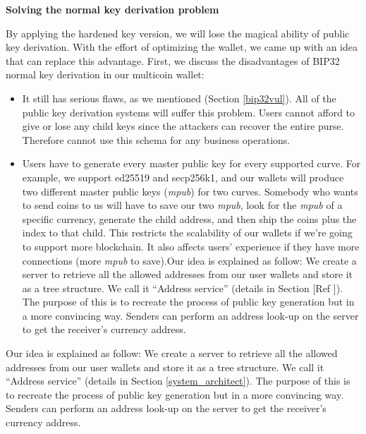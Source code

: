 \begin{adjustwidth}{1cm}{}

    \bigskip
    {\textbf{Solving the normal key derivation problem}}

    By applying the hardened key version, we will lose the magical ability of public key derivation. With the effort of optimizing the wallet, we came up with an idea that can replace this advantage. First, we discuss the disadvantages of BIP32 normal key derivation in our multicoin wallet:

    \begin{itemize}
        \item It still has serious flaws, as we mentioned (Section \ref{bip32vul}). All of the public key derivation systems will suffer this problem. Users cannot afford to give or lose any child keys since the attackers can recover the entire purse. Therefore cannot use this schema for any business operations.

        \item Users have to generate every master public key for every supported curve. For example, we support ed25519 and secp256k1, and our wallets will produce two different master public keys (\textit{mpub}) for two curves. Somebody who wants to send coins to us will have to save our two \textit{mpub}, look for the \textit{mpub} of a specific currency, generate the child address, and then ship the coins plus the index to that child. This restricts the scalability of our wallets if we're going to support more blockchain. It also affects users' experience if they have more connections (more \textit{mpub} to save).Our idea is explained as follow:
              We create a server to retrieve all the allowed addresses from our user wallets and store it as a tree structure. We call it “Address service” (details in Section [Ref ]). The purpose of this is to recreate the process of public key generation but in a more convincing way. Senders can perform an address look-up on the server to get the receiver’s currency address.

    \end{itemize}

    Our idea is explained as follow:
    We create a server to retrieve all the allowed addresses from our user wallets and store it as a tree structure. We call it “Address service” (details in Section \ref{system_architect}). The purpose of this is to recreate the process of public key generation but in a more convincing way. Senders can perform an address look-up on the server to get the receiver’s currency address.


\end{adjustwidth}
